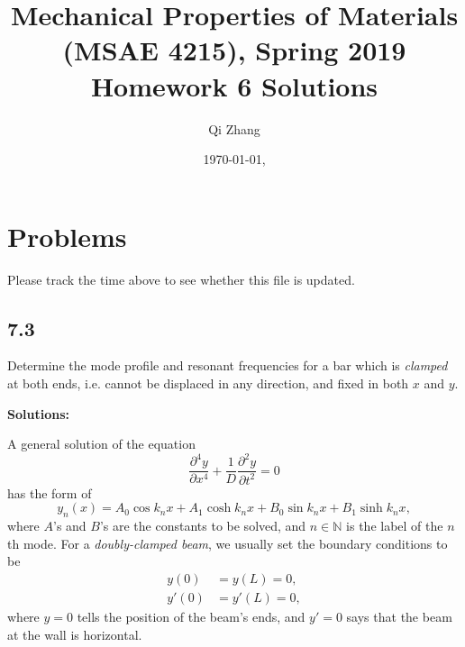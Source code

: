 \documentclass[12pt]{article}
\begin{document}

\title{Mechanical Properties of Materials (MSAE 4215), Spring 2019\\ Homework 6 Solutions}
\author{Qi Zhang}
\date{\today, \currenttime}

\maketitle

\tableofcontents
\listoffigures
\listoftables

\section{Problems}
Please track the time above to see whether this file is updated.

\subsection{7.3}
Determine the mode profile and resonant frequencies for a bar which is \textit{clamped}
at both ends, i.e. cannot be displaced in any direction, and fixed in both $x$ and $y$.

\textbf{Solutions:}

A general solution of the equation
\begin{equation}
  \frac{ \partial^4 y }{ \partial x^4 } + \frac{ 1 }{ D } \frac{ \partial^2 y }{ \partial t^2 } = 0
\end{equation}
has the form of
\begin{equation}
  y_n(x) = A_0 \cos k_n x + A_1 \cosh k_n x + B_0 \sin k_n x + B_1 \sinh k_n x,
\end{equation}
where $A$'s and $B$'s are the constants to be solved, and $n \in \mathbb{N}$ is
the label of the $n$th mode.
For a \emph{doubly-clamped beam}, we usually set the boundary conditions to be
\begin{align}
  y(0)  & = y(L) = 0,  \\
  y'(0) & = y'(L) = 0,
\end{align}
where $y = 0$ tells the position of the beam's ends,
and $y' = 0$ says that the beam at the wall is horizontal.
\end{document}
